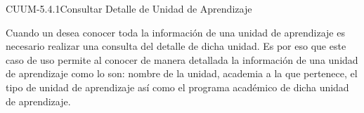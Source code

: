 \begin{UseCase}{CUUM-5.4.1}{Consultar Detalle de Unidad de Aprendizaje}
	{
		Cuando un  desea conocer toda la información de una unidad de aprendizaje es necesario realizar una consulta del detalle de dicha unidad. Es por eso que este caso de uso permite al  conocer de manera detallada  la información de una unidad de aprendizaje como lo son: nombre de la unidad, academia a la que pertenece, el tipo de unidad de aprendizaje así como el programa académico de dicha unidad de aprendizaje. 
			
		}
		
		
		

\end{UseCase}
